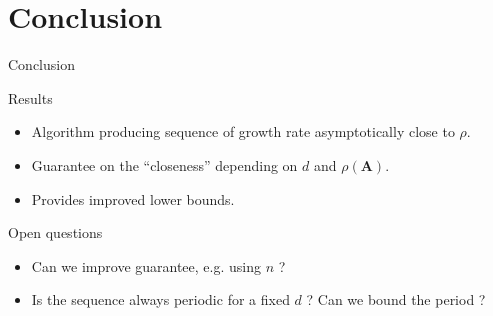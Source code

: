 \documentclass{beamer}
\newcommand{\cjsr}{\rho}
\newcommand{\Adj}{\mathbf{A}}
\begin{document}
  \section{Conclusion}
  \begin{frame}{Conclusion}
    \begin{block}{Results}
      \begin{itemize}
        \item Algorithm producing sequence of growth rate asymptotically close to $\cjsr$.
        \item Guarantee on the ``closeness'' depending on $d$ and $\rho(\Adj)$.
        \item Provides improved lower bounds.
      \end{itemize}
    \end{block}
    \begin{block}{Open questions}
      \begin{itemize}
        \item Can we improve guarantee, e.g. using $n$ ?
        \item Is the sequence always periodic for a fixed $d$ ? Can we bound the period ?
      \end{itemize}
    \end{block}
  \end{frame}
\end{document}
